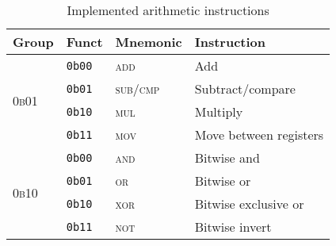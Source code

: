 \begin{table}[ht]
    \centering
    \begin{tabular}{|l l l l|}
        \hline
        \textbf{Group} & \textbf{Funct} & \textbf{Mnemonic} & \textbf{Instruction} \\
        \hline
        \multirow{4}{*}{\textsc{0b01}}
            & \texttt{0b00} & \textsc{add} & Add\\
            & \texttt{0b01} & \textsc{sub/cmp} & Subtract/compare\\
            & \texttt{0b10} & \textsc{mul} & Multiply\\
            & \texttt{0b11} & \textsc{mov} & Move between registers\\
        \hline
        \multirow{4}{*}{\textsc{0b10}} 
            & \texttt{0b00} & \textsc{and} & Bitwise and\\
            & \texttt{0b01} & \textsc{or} & Bitwise or\\
            & \texttt{0b10} & \textsc{xor} & Bitwise exclusive or\\
            & \texttt{0b11} & \textsc{not} & Bitwise invert\\
        \hline
    \end{tabular}

    \caption{Implemented arithmetic instructions}
    \label{tab:arith_instrs}
\end{table}
